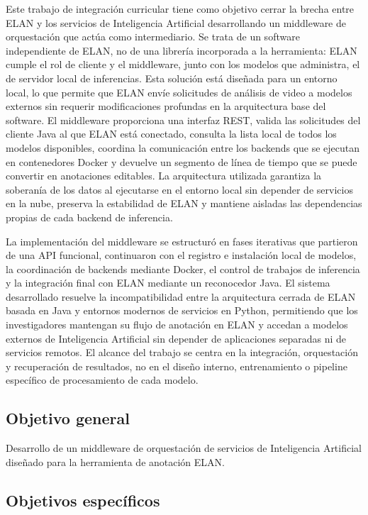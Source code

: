 \documentclass[11pt,a4paper]{article}
\begin{document}
Este trabajo de integración curricular tiene como objetivo cerrar la brecha entre ELAN y los servicios de Inteligencia Artificial desarrollando un middleware de orquestación que actúa como intermediario. Se trata de un software independiente de ELAN, no de una librería incorporada a la herramienta: ELAN cumple el rol de cliente y el middleware, junto con los modelos que administra, el de servidor local de inferencias. Esta solución está diseñada para un entorno local, lo que permite que ELAN envíe solicitudes de análisis de video a modelos externos sin requerir modificaciones profundas en la arquitectura base del software. El middleware proporciona una interfaz REST, valida las solicitudes del cliente Java al que ELAN está conectado, consulta la lista local de todos los modelos disponibles, coordina la comunicación entre los backends que se ejecutan en contenedores Docker y devuelve un segmento de línea de tiempo que se puede convertir en anotaciones editables. La arquitectura utilizada garantiza la soberanía de los datos al ejecutarse en el entorno local sin depender de servicios en la nube, preserva la estabilidad de ELAN y mantiene aisladas las dependencias propias de cada backend de inferencia.

La implementación del middleware se estructuró en fases iterativas que partieron de una API funcional, continuaron con el registro e instalación local de modelos, la coordinación de backends mediante Docker, el control de trabajos de inferencia y la integración final con ELAN mediante un reconocedor Java. El sistema desarrollado resuelve la incompatibilidad entre la arquitectura cerrada de ELAN basada en Java y entornos modernos de servicios en Python, permitiendo que los investigadores mantengan su flujo de anotación en ELAN y accedan a modelos externos de Inteligencia Artificial sin depender de aplicaciones separadas ni de servicios remotos. El alcance del trabajo se centra en la integración, orquestación y recuperación de resultados, no en el diseño interno, entrenamiento o pipeline específico de procesamiento de cada modelo.


\subsection{Objetivo general}
Desarrollo de un middleware de orquestación de servicios de Inteligencia Artificial diseñado para la herramienta de anotación ELAN.

\subsection{Objetivos específicos}
\end{document}
